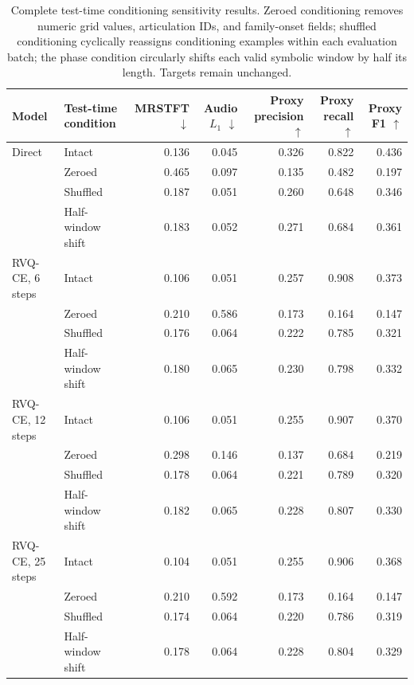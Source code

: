 \begin{table}[t]
\centering
\small
\setlength{\tabcolsep}{5pt}
\begin{tabular}{llrrrrr}
\toprule
Model & Test-time condition & MRSTFT $\downarrow$ & Audio $L_1$ $\downarrow$ & Proxy precision $\uparrow$ & Proxy recall $\uparrow$ & Proxy F1 $\uparrow$ \\
\midrule
Direct & Intact & 0.136 & 0.045 & 0.326 & 0.822 & 0.436 \\
 & Zeroed & 0.465 & 0.097 & 0.135 & 0.482 & 0.197 \\
 & Shuffled & 0.187 & 0.051 & 0.260 & 0.648 & 0.346 \\
 & Half-window shift & 0.183 & 0.052 & 0.271 & 0.684 & 0.361 \\
\midrule
RVQ-CE, 6 steps & Intact & 0.106 & 0.051 & 0.257 & 0.908 & 0.373 \\
 & Zeroed & 0.210 & 0.586 & 0.173 & 0.164 & 0.147 \\
 & Shuffled & 0.176 & 0.064 & 0.222 & 0.785 & 0.321 \\
 & Half-window shift & 0.180 & 0.065 & 0.230 & 0.798 & 0.332 \\
\midrule
RVQ-CE, 12 steps & Intact & 0.106 & 0.051 & 0.255 & 0.907 & 0.370 \\
 & Zeroed & 0.298 & 0.146 & 0.137 & 0.684 & 0.219 \\
 & Shuffled & 0.178 & 0.064 & 0.221 & 0.789 & 0.320 \\
 & Half-window shift & 0.182 & 0.065 & 0.228 & 0.807 & 0.330 \\
\midrule
RVQ-CE, 25 steps & Intact & 0.104 & 0.051 & 0.255 & 0.906 & 0.368 \\
 & Zeroed & 0.210 & 0.592 & 0.173 & 0.164 & 0.147 \\
 & Shuffled & 0.174 & 0.064 & 0.220 & 0.786 & 0.319 \\
 & Half-window shift & 0.178 & 0.064 & 0.228 & 0.804 & 0.329 \\
\bottomrule
\end{tabular}
\caption{Complete test-time conditioning sensitivity results. Zeroed conditioning removes numeric grid values, articulation IDs, and family-onset fields; shuffled conditioning cyclically reassigns conditioning examples within each evaluation batch; the phase condition circularly shifts each valid symbolic window by half its length. Targets remain unchanged.}
\label{tab:frontend_inference_ablation_full}
\end{table}
